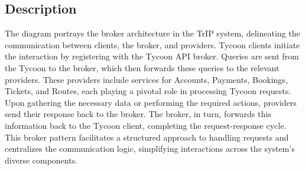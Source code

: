 \subsection*{Description}
The diagram portrays the broker architecture in the TrIP system, delineating the communication between clients, the broker, and providers. Tycoon clients initiate the interaction by registering with the Tycoon API broker. Queries are sent from the Tycoon to the broker, which then forwards these queries to the relevant providers. These providers include services for Accounts, Payments, Bookings, Tickets, and Routes, each playing a pivotal role in processing Tycoon requests. Upon gathering the necessary data or performing the required actions, providers send their response back to the broker. The broker, in turn, forwards this information back to the Tycoon client, completing the request-response cycle. This broker pattern facilitates a structured approach to handling requests and centralizes the communication logic, simplifying interactions across the system’s diverse components.


